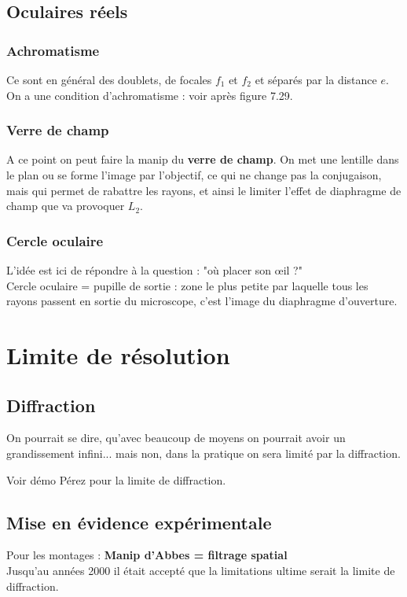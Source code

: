\documentclass[12pt,prb,aps,epsf]{article}
\begin{document}
\subsection{Oculaires réels}
\subsubsection{Achromatisme}
Ce sont en général des doublets, de focales $f_1$ et $f_2$ et séparés par la distance $e$. On a une condition d'achromatisme : voir après figure 7.29.

\subsubsection{Verre de champ}
A ce point on peut faire la manip du \textbf{verre de champ}. On met une lentille dans le plan ou se forme l'image par l'objectif, ce qui ne change pas la conjugaison, mais qui permet de rabattre les rayons, et ainsi le limiter l'effet de diaphragme de champ que va provoquer $L_2$.

\subsubsection{Cercle oculaire}
L'idée est ici de répondre à la question : "où placer son œil ?"\\
Cercle oculaire = pupille de sortie : zone le plus petite par laquelle tous les rayons passent en sortie du microscope, c'est l'image du diaphragme d'ouverture.

\section{Limite de résolution}
\subsection{Diffraction}
On pourrait se dire, qu'avec beaucoup de moyens on pourrait avoir un grandissement infini... mais non, dans la pratique on sera limité par la diffraction.

Voir démo Pérez pour la limite de diffraction.

\subsection{Mise en évidence expérimentale}
Pour les montages : \textbf{Manip d'Abbes = filtrage spatial}\\

Jusqu'au années 2000 il était accepté que la limitations ultime serait la limite de diffraction.
\end{document}
